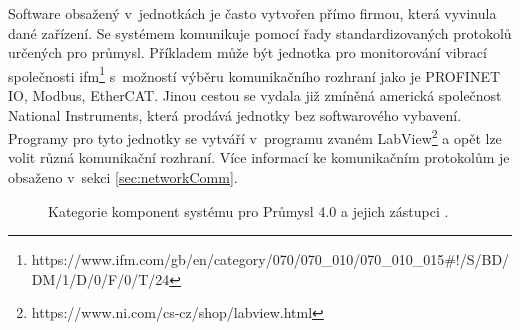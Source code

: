 Software obsažený v~jednotkách je často vytvořen přímo firmou, která vyvinula dané zařízení. Se systémem komunikuje pomocí řady standardizovaných protokolů určených pro průmysl. Příkladem může být jednotka pro monitorování vibrací společnosti ifm\footnote{https://www.ifm.com/gb/en/category/070/070\_010/070\_010\_015\#!/S/BD/DM/1/D/0/F/0/T/24} s~možností výběru komunikačního rozhraní jako je PROFINET IO, Modbus, EtherCAT. Jinou cestou se vydala již zmíněná americká společnost National Instruments, která prodává jednotky bez softwarového vybavení. Programy pro tyto jednotky se vytváří v~programu zvaném LabView\footnote{https://www.ni.com/cs-cz/shop/labview.html} a opět lze volit různá komunikační rozhraní. Více informací ke komunikačním protokolům je obsaženo v~sekci \ref{sec:networkComm}.

\begin{figure}[h]
  \centering
  \caption{Kategorie komponent systému pro Průmysl 4.0 a jejich zástupci \cite{eclipse}.}\label{pic:eclipseIOT}
\end{figure}

